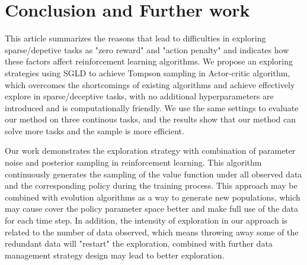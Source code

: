 \section{Conclusion and Further work}
This article summarizes the reasons that lead to difficulties in exploring sparse/depetive tasks as "zero reward" and "action penalty" and indicates how these factors affect reinforcement learning algorithms. We propose an exploring strategies using SGLD to achieve Tompson sampling in Actor-critic algorithm, which overcomes the shortcomings of existing algorithms and achieve effectively explore in sparse/deceptive tasks, with no additional hyperparameters are introduced and is computationally friendly. We use the same settings to evaluate our method on three continous tasks, and the results show that our method can solve more tasks and the sample is more efficient.

Our work demonstrates the exploration strategy with combination of parameter noise and posterior sampling in reinforcement learning. This algorithm continuously generates the sampling of the value function under all observed data and the corresponding policy during the training process. This approach may be combined with evolution algorithms as a way to generate new populations, which may cause cover the policy parameter space better and make full use of the data for each time step. In addition, the intensity of exploration in our approach is related to the number of data observed, which means throwing away some of the redundant data will "restart" the exploration, combined with further data management strategy design may lead to better exploration.
